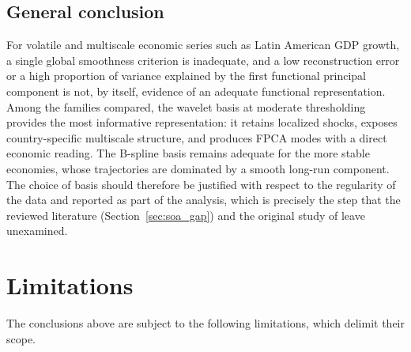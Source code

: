 \subsection{General conclusion}

For volatile and multiscale economic series such as Latin American GDP
growth, a single global smoothness criterion is inadequate, and a low
reconstruction error or a high proportion of variance explained by the
first functional principal component is not, by itself, evidence of an
adequate functional representation. Among the families compared, the
wavelet basis at moderate thresholding provides the most informative
representation: it retains localized shocks, exposes country-specific
multiscale structure, and produces FPCA modes with a direct economic
reading. The B-spline basis remains adequate for the more stable
economies, whose trajectories are dominated by a smooth long-run
component. The choice of basis should therefore be justified with
respect to the regularity of the data and reported as part of the
analysis, which is precisely the step that the reviewed literature
(Section~\ref{sec:soa_gap}) and the original study of
\cite{padilla2020} leave unexamined.

\section{Limitations}
\label{sec:limitations}

The conclusions above are subject to the following limitations, which
delimit their scope.

